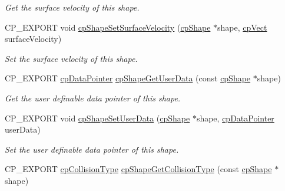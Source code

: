 \begin{DoxyCompactItemize}
\begin{DoxyCompactList}\small\item\em Get the surface velocity of this shape. \end{DoxyCompactList}\item 
\mbox{\label{group__cp_shape_ga6300af79e7bf2427e8142eb5e15ad394}} 
C\+P\+\_\+\+E\+X\+P\+O\+RT void \mbox{\hyperlink{group__cp_shape_ga6300af79e7bf2427e8142eb5e15ad394}{cp\+Shape\+Set\+Surface\+Velocity}} (\mbox{\hyperlink{structcp_shape}{cp\+Shape}} $\ast$shape, \mbox{\hyperlink{structcp_vect}{cp\+Vect}} surface\+Velocity)
\begin{DoxyCompactList}\small\item\em Set the surface velocity of this shape. \end{DoxyCompactList}\item 
\mbox{\label{group__cp_shape_gab8e58cc69432190ffb0f00cb0f0dc400}} 
C\+P\+\_\+\+E\+X\+P\+O\+RT \mbox{\hyperlink{group__basic_types_ga2ac2c3c31e21893941f9e4f8ee279447}{cp\+Data\+Pointer}} \mbox{\hyperlink{group__cp_shape_gab8e58cc69432190ffb0f00cb0f0dc400}{cp\+Shape\+Get\+User\+Data}} (const \mbox{\hyperlink{structcp_shape}{cp\+Shape}} $\ast$shape)
\begin{DoxyCompactList}\small\item\em Get the user definable data pointer of this shape. \end{DoxyCompactList}\item 
\mbox{\label{group__cp_shape_ga1de05153aca70a3c61c454707c89813e}} 
C\+P\+\_\+\+E\+X\+P\+O\+RT void \mbox{\hyperlink{group__cp_shape_ga1de05153aca70a3c61c454707c89813e}{cp\+Shape\+Set\+User\+Data}} (\mbox{\hyperlink{structcp_shape}{cp\+Shape}} $\ast$shape, \mbox{\hyperlink{group__basic_types_ga2ac2c3c31e21893941f9e4f8ee279447}{cp\+Data\+Pointer}} user\+Data)
\begin{DoxyCompactList}\small\item\em Set the user definable data pointer of this shape. \end{DoxyCompactList}\item 
\mbox{\label{group__cp_shape_gae1f59960451b5324c2d1992ba9023c5b}} 
C\+P\+\_\+\+E\+X\+P\+O\+RT \mbox{\hyperlink{group__basic_types_gae83e2f50965eb441e36ffff1e32e6d02}{cp\+Collision\+Type}} \mbox{\hyperlink{group__cp_shape_gae1f59960451b5324c2d1992ba9023c5b}{cp\+Shape\+Get\+Collision\+Type}} (const \mbox{\hyperlink{structcp_shape}{cp\+Shape}} $\ast$shape)

\end{DoxyCompactItemize}
